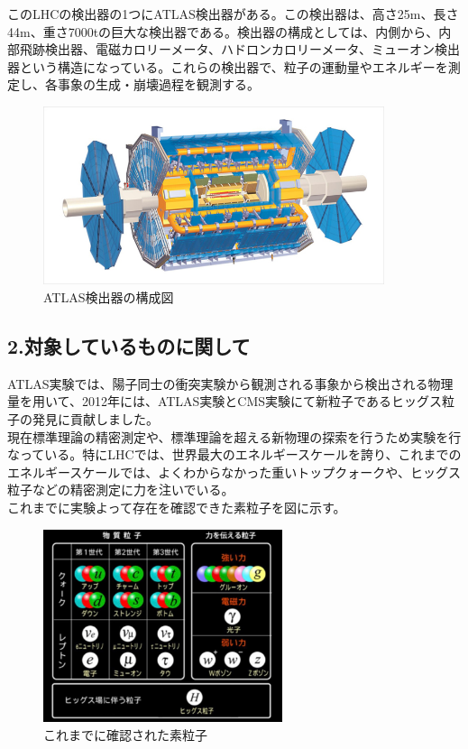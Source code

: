 \documentclass{jreport}
\begin{document}
このLHCの検出器の1つにATLAS検出器がある。この検出器は、高さ25m、長さ44m、重さ7000tの巨大な検出器である。検出器の構成としては、内側から、内部飛跡検出器、電磁カロリーメータ、ハドロンカロリーメータ、ミューオン検出器という構造になっている。これらの検出器で、粒子の運動量やエネルギーを測定し、各事象の生成・崩壊過程を観測する。
\begin{figure}[htbp]
	\begin{center}
		\includegraphics[width=100mm]{image_atlas_03.jpg}
	\end{center}
	\caption{ATLAS検出器の構成図}
	\label{fig:two}
\end{figure}

\newpage
\subsection*{2.対象しているものに関して}
\noindent
ATLAS実験では、陽子同士の衝突実験から観測される事象から検出される物理量を用いて、2012年には、ATLAS実験とCMS実験にて新粒子であるヒッグス粒子の発見に貢献しました。\\
現在標準理論の精密測定や、標準理論を超える新物理の探索を行うため実験を行なっている。特にLHCでは、世界最大のエネルギースケールを誇り、これまでのエネルギースケールでは、よくわからなかった重いトップクォークや、ヒッグス粒子などの精密測定に力を注いでいる。\\
これまでに実験よって存在を確認できた素粒子を図に示す。
\begin{figure}[htbp]
	\begin{center}
		\includegraphics[width=70mm]{001l.jpg}
	\end{center}
	\caption{これまでに確認された素粒子}
	\label{fig:three}
\end{figure}
\end{document}
